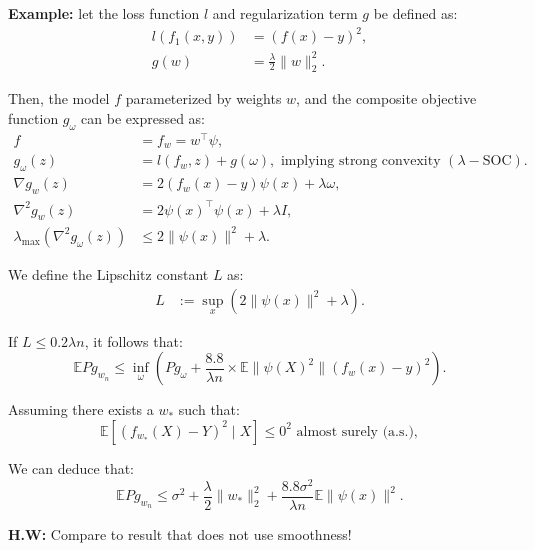 \documentclass[twoside]{article}
\begin{document}
\textbf{Example:} 
let the loss function $l$ and regularization term $g$ be defined as:
\begin{align*}
l\left(f_{1}(x, y)\right) &= (f(x)-y)^{2}, \\
g(w) &= \frac{\lambda}{2}\|w\|_{2}^{2}.
\end{align*}

Then, the model $f$ parameterized by weights $w$, and the composite objective function $g_{\omega}$ can be expressed as:
\begin{align*}
f &= f_{w} = w^{\top} \psi, \\
g_{\omega}(z) &= l\left(f_{w}, z\right) + g(\omega), \text{ implying strong convexity } (\lambda-\text{SOC}). \\
\nabla g_{w}(z) &= 2\left(f_{w}(x) - y\right) \psi(x) + \lambda \omega, \\
\nabla^{2} g_{w}(z) &= 2 \psi(x)^{\top} \psi(x) + \lambda I, \\
\lambda_{\max}\left(\nabla^{2} g_{\omega}(z)\right) &\leq 2\|\psi(x)\|^{2} + \lambda.
\end{align*}

We define the Lipschitz constant $L$ as:
\begin{align*}
L &:= \sup_{x} \left(2\|\psi(x)\|^{2} + \lambda\right).
\end{align*}

If $L \leqslant 0.2 \lambda n$, it follows that:
\begin{equation*}
\mathbb{E} P g_{w_{n}} \leq \inf_{\omega} \left(P g_{\omega} + \frac{8.8}{\lambda n} \times \mathbb{E}\| \psi(X)^2  \| (f_w(x) - y)^2 \right).
\end{equation*}

Assuming there exists a $w_{*}$ such that:
\begin{equation*}
\mathbb{E}\left[\left(f_{w_{*}}(X) - Y\right)^{2} \mid X\right] \leq 0^{2} \text{ almost surely (a.s.)},
\end{equation*}

We can deduce that:
\begin{equation*}
\mathbb{E} P g_{w_{n}} \leq \sigma^{2} + \frac{\lambda}{2}\|w_{*}\|_{2}^{2} + \frac{8.8 \sigma^{2}}{\lambda n} \mathbb{E}\|\mathcal{\psi}(x)\|^{2}.
\end{equation*}

\vspace{2cm}

\textbf{H.W:} Compare to result that does not use smoothness!



\end{document}
